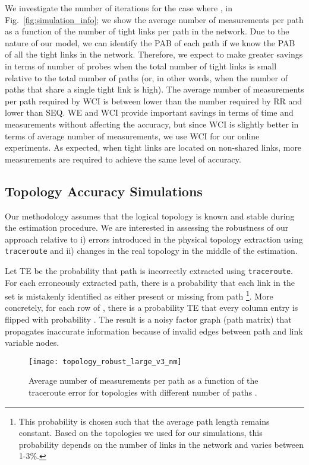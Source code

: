 \documentclass[final,5p,times,twocolumn]{elsarticle}
\begin{document}
We investigate the number of iterations for the case where ,  in Fig.~\ref{fig:simulation_info}; we show the average number of measurements per path as a function of the number of tight links per path in the network.  
Due to the nature of our model, we can identify the PAB of each path if we know the PAB of all the tight links in the network.  
Therefore, we expect to make greater savings in terms of number of probes when the total number of tight links is small relative to the total number of paths (or, in other words, when the number of paths that share a single tight link is high).  
The average number of measurements per path required by WCI is between  lower than the number required by RR and  lower than SEQ.
WE and WCI provide important savings in terms of time and measurements without affecting the accuracy, but since WCI is slightly better in terms of average number of measurements, we use WCI for our online experiments.  As expected, when tight links are located on non-shared links, more measurements are required to achieve the same level of accuracy.

\subsection{Topology Accuracy Simulations}
\label{ssec:robust}

Our methodology assumes that the logical topology is known and stable during the estimation procedure.  
We are interested in assessing the robustness of our approach relative to i) errors introduced in the physical topology extraction using \texttt{traceroute} 
and ii) changes in the real topology in the middle of the estimation.

Let TE be the probability that path  is incorrectly extracted using \texttt{traceroute}.
For each erroneously extracted path, there is a probability  that each link in the set  is mistakenly identified as either present or missing from path \footnote{This probability is chosen such that the average path length remains constant.  Based on the topologies we used for our simulations, this probability depends on the number of links in the network and varies between 1-3\%.}.  More concretely, for each row of , there is a probability TE that every column entry is flipped with probability .  The result is a noisy factor graph (path matrix) that propagates inaccurate information because of invalid edges between path and link variable nodes.

\begin{figure} [!h]
\centering
\texttt{[image: topology\_robust\_large\_v3\_nm]}
\caption{Average number of measurements per path as a function of the traceroute error for topologies with different number of paths .\label{fig:nm_large_v3}}
\end{figure}
\end{document}

